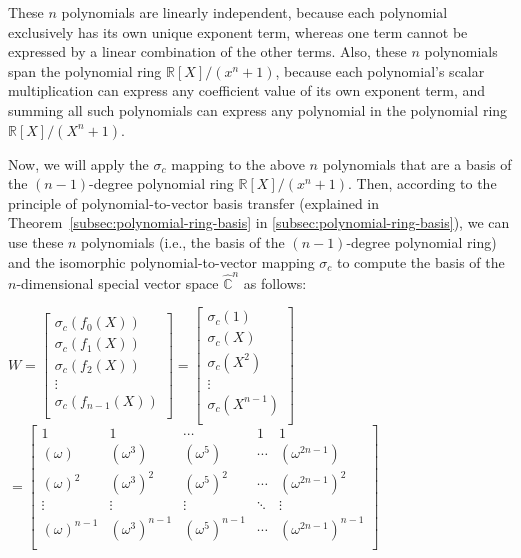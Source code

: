 These $n$ polynomials are linearly independent, because each polynomial exclusively has its own unique exponent term, whereas one term cannot be expressed by a linear combination of the other terms. Also, these $n$ polynomials span the polynomial ring $\mathbb{R}[X]/(x^n + 1)$, because each polynomial's scalar multiplication can express any coefficient value of its own exponent term, and summing all such polynomials can express any polynomial in the polynomial ring $\mathbb{R}[X]/(X^n + 1)$.


Now, we will apply the $\sigma_c$ mapping to the above $n$ polynomials that are a basis of the $(n-1)$-degree polynomial ring $\mathbb{R}[X]/(x^n + 1)$. Then, according to the principle of polynomial-to-vector basis transfer (explained in Theorem~\ref*{subsec:polynomial-ring-basis} in \autoref{subsec:polynomial-ring-basis}), we can use these $n$ polynomials (i.e., the basis of the $(n-1)$-degree polynomial ring) and the isomorphic polynomial-to-vector mapping $\sigma_c$ to compute the basis of the $n$-dimensional special vector space $\hat{\mathbb C}^{n}$ as follows: 

$W = \begin{bmatrix}
\sigma_c(f_0(X)) \\
\sigma_c(f_1(X)) \\
\sigma_c(f_2(X)) \\
\vdots \\
\sigma_c(f_{n-1}(X)) \\
\end{bmatrix}
= \begin{bmatrix}
\sigma_c(1) \\
\sigma_c(X) \\
\sigma_c(X^2) \\
\vdots \\
\sigma_c(X^{n-1}) \\
\end{bmatrix}$
$= \begin{bmatrix}
1 & 1 & \cdots & 1 & 1\\
(\omega) & (\omega^3) & (\omega^5) & \cdots & (\omega^{2n-1})\\
(\omega)^2 & (\omega^3)^2 & (\omega^5)^2 & \cdots & (\omega^{2n-1})^2\\
\vdots & \vdots & \vdots & \ddots & \vdots \\
(\omega)^{n-1} & (\omega^3)^{n-1} & (\omega^5)^{n-1} & \cdots & (\omega^{2n-1})^{n-1}\\
\end{bmatrix}$

